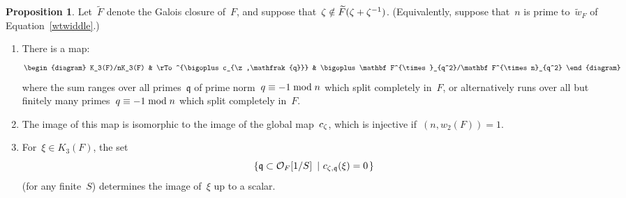 \documentclass[12pt,reqno]{amsart}
\theoremstyle{definition}
\newtheorem{proposition}[theorem]{Proposition}
\def\mod{\;\text{\rm mod}\;}
\def\F{\mathbf F}   %
\def\wF{\widetilde{F}}
\def\nn{n}
\def\wF{\widetilde{F}}
\def\q{\mathfrak{q}}
\def\OL{\mathcal{O}}
\def\ww{\widetilde w_F}
\begin{document}
\begin{proposition}
\label{prop:cheb}
Let~$\wF$ denote the Galois closure of~$F$, and suppose 
that~$\z \notin \wF(\z + \z^{-1})$.  (Equivalently, suppose that~$\nn$
is prime to~$\ww$ of Equation~\ref{wtwiddle}.)
\begin{enumerate}[label=(\alph*)]
\item  \label{parta.cheb} There is a map:
$$
\begin{diagram}
K_3(F)/\nn K_3(F) & \rTo^{\bigoplus c_{\z,\q}} & 
\bigoplus 
\F^{\times}_{q^2}/\F^{\times \nn}_{q^2}
\end{diagram}
$$
where the sum ranges over all primes~$\q$ of prime 
norm~$q \equiv -1 \mod \nn$ which 
split completely in~$F$, or alternatively runs over all but finitely 
many primes~$q \equiv -1 \mod \nn$ which split completely in~$F$.
\item   \label{partb.cheb} 
The image of this map is isomorphic to the image of the global map~$c_\zeta$, 
which is injective if~$(n,w_2(F)) = 1$.
\item  \label{partc.cheb} 
For~$\xi \in K_3(F)$, the set
$$
\left\{ \q \subset \OL_F[1/S] \ \left| \ c_{\z,\q}(\xi) = 0 \right. \right\}
$$
(for any finite~$S$) determines the image of~$\xi$ up to a scalar. 
\end{enumerate}
\end{proposition}
\end{document}
